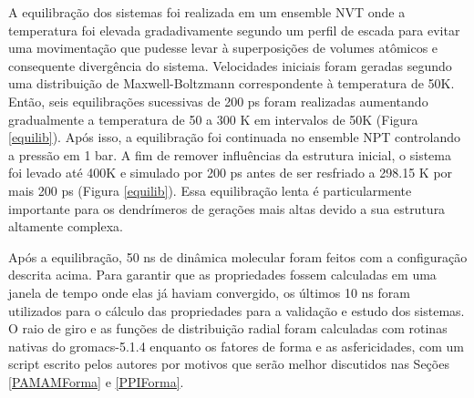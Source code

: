 A equilibração dos sistemas foi realizada em um ensemble NVT onde a temperatura foi elevada gradadivamente segundo um perfil de escada para evitar uma movimentação que pudesse levar à superposições de volumes atômicos e consequente divergência do sistema.
Velocidades iniciais foram geradas segundo uma distribuição de Maxwell-Boltzmann correspondente à temperatura de 50K.
Então, seis equilibrações sucessivas de 200 ps foram realizadas aumentando gradualmente a temperatura de 50 a 300 K em intervalos de 50K (Figura \ref{equilib}).
Após isso, a equilibração foi continuada no ensemble NPT controlando a pressão em 1 bar.
A fim de remover influências da estrutura inicial, o sistema foi levado até 400K e simulado por 200 ps antes de ser resfriado a 298.15 K por mais 200 ps (Figura \ref{equilib}).
Essa equilibração lenta é particularmente importante para os dendrímeros de gerações mais altas devido a sua estrutura altamente complexa.

Após a equilibração, 50 ns de dinâmica molecular foram feitos com a configuração descrita acima. 
Para garantir que as propriedades fossem calculadas em uma janela de tempo onde elas já haviam convergido, os últimos 10 ns foram utilizados para o cálculo das propriedades para a validação e estudo dos sistemas.
O raio de giro e as funções de distribuição radial foram calculadas com rotinas nativas do gromacs-5.1.4 enquanto os fatores de forma e as asfericidades, com um script escrito pelos autores por motivos que serão melhor discutidos nas Seções \ref{PAMAMForma} e \ref{PPIForma}.

\pagebreak
